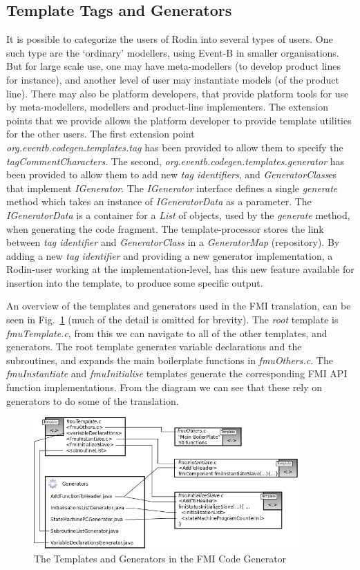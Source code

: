 \documentclass{llncs}%
\begin{document}
\subsection{Template Tags and Generators}
It is possible to categorize the users of Rodin into several types of users. One such type are the `ordinary' modellers, using Event-B in smaller organisations. But for large scale use, one may have meta-modellers (to develop product lines for instance), and another level of user may instantiate models (of the product line). There may also be platform developers, that provide platform tools for use by meta-modellers, modellers and product-line implementers. The extension points that we provide allows the platform developer to provide template utilities for the other users. The first extension point \\ \emph{org.eventb.codegen.templates.tag} has been provided to allow them to specify the \emph{tagCommentCharacters}. The second, \emph{org.eventb.codegen.templates.generator} has been provided to allow them to add new \emph{tag identifiers}, and \emph{GeneratorClass}es that implement \emph{IGenerator}. The \emph{IGenerator} interface defines a single \emph{generate} method which takes an instance of \emph{IGeneratorData} as a parameter. The \emph{IGeneratorData}  is a container for  a \emph{List} of objects, used by the \emph{generate} method, when generating the code fragment. The template-processor stores the link between \emph{tag identifier} and \emph{GeneratorClass} in a \emph{GeneratorMap} (repository). By adding a new \emph{tag identifier} and providing a new generator implementation, a Rodin-user working at the implementation-level, has this new feature available for insertion into the template, to produce some specific output. 

An overview of the  templates and generators used in the FMI translation, can be seen in Fig.~\ref{fig:templateStructure} (much of the detail is omitted for brevity). The \emph{root} template is \emph{fmuTemplate.c}, from this we can navigate to all of the other templates, and generators. The root template generates variable declarations and the subroutines, and expands the main boilerplate functions in \emph{fmuOthers.c}. The \emph{fmuInstantiate} and \emph{fmuInitialise} templates generate the corresponding FMI API function implementations. From the diagram we can see that these rely on generators to do some of the translation.
%
\begin{figure}
\centering
\includegraphics[width=0.9\textwidth]{templateStructure.png}
\caption{The Templates and Generators in the FMI Code Generator}
\label{fig:templateStructure}
\end{figure}
%
\end{document}
